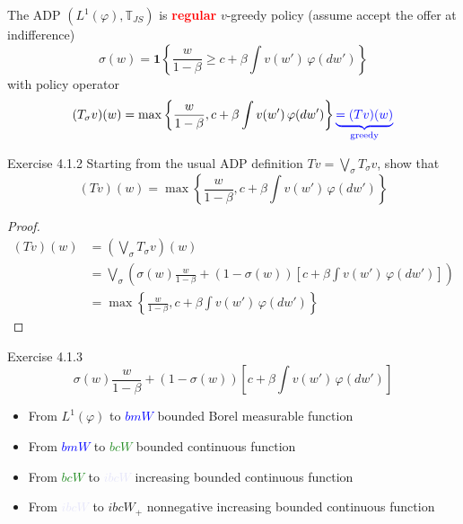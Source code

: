 \documentclass[aspectratio=169]{beamer} %
\begin{document}
\begin{frame}{The ADP $(L^1(\varphi),\mathbb{T}_{JS})$ is \textcolor{red}{\textbf{regular}}}
$v$-greedy policy (assume accept the offer at indifference)
    $$
    \sigma (w) = \mathbf{1}\left\{\frac{w}{1-\beta}\ge c+\beta\int v(w') \, \varphi(dw') \right\}
    $$
    with policy operator
    $$
    (T_\sigma v)(w) = \max\left\{\frac{w}{1-\beta}, c+\beta\int v(w') \, \varphi(dw')\right\} \textcolor{blue}{\underbrace{= (Tv)(w)}_{\text{greedy}}}
    $$
\end{frame}

\begin{frame}{Exercise 4.1.2}
Starting from the usual ADP definition $Tv = \bigvee_\sigma T_\sigma v$, show that
$$
(Tv)(w) = \max\left\{\frac{w}{1-\beta}, c+\beta\int v(w')\, \varphi(dw')\right\}
$$
\begin{proof}
    \begin{align*}
        (Tv)(w) &= \left(\bigvee_\sigma T_\sigma v\right)(w)\\
        &= \bigvee_\sigma \left(\sigma(w) \frac{w}{1-\beta} + (1-\sigma(w))\left[c+\beta\int v(w')\, \varphi(dw')\right]\right)\\
        &= \max\left\{\frac{w}{1-\beta}, c+\beta\int v(w') \, \varphi(dw')\right\}
    \end{align*}
    
\end{proof}
\end{frame}

\begin{frame}{Exercise 4.1.3}
$$
\sigma(w) \frac{w}{1-\beta} + (1-\sigma(w))\left[c+\beta\int v(w')\, \varphi(dw')\right]
$$
\begin{itemize}
    \item From $L^1(\varphi)$ to \textcolor{blue}{$bmW$} bounded Borel measurable function
    \item From \textcolor{blue}{$bmW$} to \textcolor{ForestGreen}{$bcW$} bounded continuous function
    \item From \textcolor{ForestGreen}{$bcW$} to \textcolor{Lavender}{$ibcW$} increasing bounded continuous function
    \item From \textcolor{Lavender}{$ibcW$} to \textcolor{RedOrange}{$ibcW_+$} nonnegative increasing bounded continuous function
\end{itemize}
\end{frame}
\end{document}
